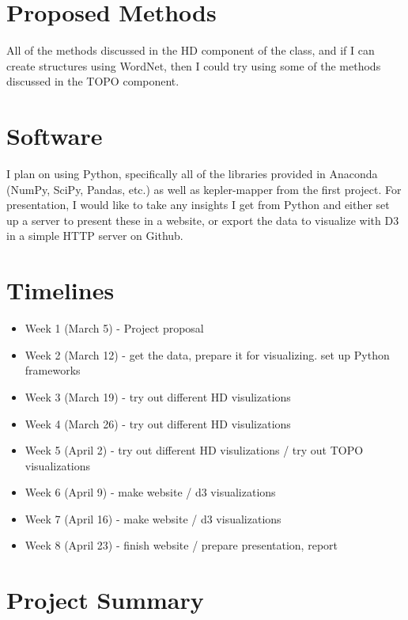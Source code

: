 \documentclass{article}
\begin{document}
\section{Proposed Methods}

All of the methods discussed in the HD component of the class, and if I can create structures using WordNet, then I could try using some of the methods discussed in the TOPO component. 

\section{Software}

I plan on using Python, specifically all of the libraries provided in Anaconda (NumPy, SciPy, Pandas, etc.) as well as kepler-mapper from the first project. For presentation, I would like to take any insights I get from Python and either set up a server to present these in a website, or export the data to visualize with D3 in a simple HTTP server on Github. 

\section{Timelines}

\begin{itemize}
\item Week 1 (March 5) - Project proposal
\item Week 2 (March 12) - get the data, prepare it for visualizing. set up Python frameworks
\item Week 3 (March 19) - try out different HD visulizations
\item Week 4 (March 26) - try out different HD visulizations
\item Week 5 (April 2) - try out different HD visulizations / try out TOPO visualizations
\item Week 6 (April 9) - make website / d3 visualizations
\item Week 7 (April 16) - make website / d3 visualizations
\item Week 8 (April 23) - finish website / prepare presentation, report
\end{itemize}

\section{Project Summary}
\end{document}

